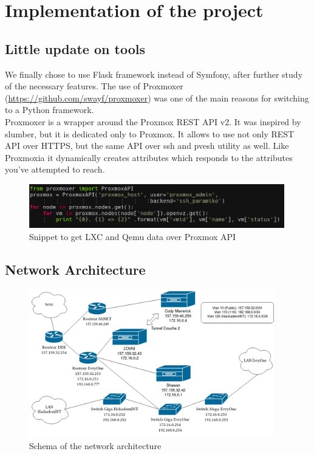 \pagebreak

\section{Implementation of the project}

\subsection{Little update on tools}

We finally chose to use Flask framework instead of Symfony, after further study of the necessary features.
The use of
Proxmoxer (\url{https://github.com/swayf/proxmoxer}) was one of the main reasons for switching to a Python framework. \\


Proxmoxer is a wrapper around the Proxmox REST API v2.
It was inspired by slumber, but it is dedicated only to Proxmox. It allows to use not only REST API over HTTPS, but the same API over ssh and pvesh utility as well.
Like Proxmoxia it dynamically creates attributes which responds to the attributes you've attempted to reach.
\\

\begin{figure}[!h]
  \centering
  \includegraphics[width=0.99\textwidth]{images/proxmoxer.png}
  \caption{Snippet to get LXC and Qemu data over Proxmox API}
  \label{Proxmoxer}
\end{figure}


\subsection{Network Architecture}

\vspace{2cm}

\begin{figure}[!h]
  \centering
  \includegraphics[width=0.95\textwidth]{images/reseau.png}
  \caption{Schema of the network architecture}
  \label{Proxmoxer}
\end{figure}


